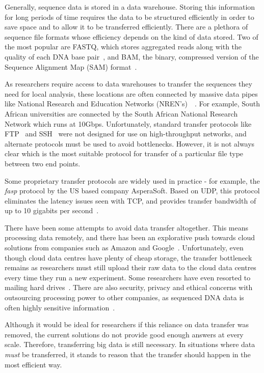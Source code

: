 \documentclass{sig-alternate-05-2015}
\begin{document}
Generally, sequence data is stored in a data warehouse. Storing this information for long periods of time requires the data to be structured efficiently in order to save space and to allow it to be transferred efficiently.
There are a plethora of sequence file formats whose efficiency depends on the kind of data stored. Two of the most popular are FASTQ, which stores aggregated reads along with the quality of each DNA base pair~\cite{cock2010sanger}, and BAM, the binary, compressed version of the Sequence Alignment Map (SAM) format~\cite{SAMspec}.

As researchers require access to data warehouses to transfer the sequences they need for local analysis, these locations are often connected by massive data pipes like National Research and Education Networks (NREN's)~\cite{sanren}~\cite{van2011unlocking}. For example, South African universities are connected by the South African National Research Network which runs at 10Gbps. Unfortunately, standard transfer protocols like FTP~\cite{venkatachalam2007openssh} and SSH~\cite{venkatachalam2007openssh} were not designed for use on high-throughput networks, and alternate protocols must be used to avoid bottlenecks. However, it is not always clear which is the most suitable protocol for transfer of a particular file type between two end points.

Some proprietary transfer protocols are widely used in practice - for example, the \textit{fasp} protocol by the US based company AsperaSoft. Based on UDP, this protocol eliminates the latency issues seen with TCP, and provides transfer bandwidth of up to 10 gigabits per second~\cite{fan2010petabytes}.

There have been some attempts to avoid data transfer altogether. This means processing data remotely, and there has been an explorative push towards cloud solutions from companies such as Amazon and Google~\cite{baker2010next}. Unfortunately, even though cloud data centres have plenty of cheap storage, the transfer bottleneck remains as researchers must still upload their raw data to the cloud data centres every time they run a new experiment. Some researchers have even resorted to mailing hard drives~\cite{baker2010next}.
There are also security, privacy and ethical concerns with outsourcing processing power to other companies, as sequenced DNA data is often highly sensitive information~\cite{marx2013biology}.

Although it would be ideal for researchers if this reliance on data transfer was removed, the current solutions do not provide good enough answers at every scale. Therefore, transferring big data is still necessary.
In situations where data \textit{must} be transferred, it stands to reason that the transfer should happen in the most efficient way.
\end{document}

